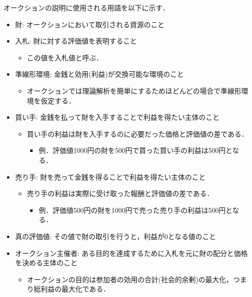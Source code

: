 オークションの説明に使用される用語を以下に示す\cite{market}．

\begin{itemize}
\tightlist
\item
  財: オークションにおいて取引される資源のこと
\item
  入札: 財に対する評価値を表明すること

  \begin{itemize}
  \tightlist
  \item
    この値を入札値と呼ぶ．
  \end{itemize}
\item
  準線形環境: 金銭と効用(利益)が交換可能な環境のこと

  \begin{itemize}
  \tightlist
  \item
    オークションでは理論解析を簡単にするためほどんどの場合で準線形環境を仮定する．
  \end{itemize}
\item
  買い手: 金銭を払って財を入手することで利益を得たい主体のこと

  \begin{itemize}
  \tightlist
  \item
    買い手の利益は財を入手するのに必要だった価格と評価値の差である．

    \begin{itemize}
    \tightlist
    \item
      例．評価値1000円の財を500円で買った買い手の利益は500円となる．
    \end{itemize}
  \end{itemize}
\item
  売り手: 財を売って金銭を得ることで利益を得たい主体のこと

  \begin{itemize}
  \tightlist
  \item
    売り手の利益は実際に受け取った報酬と評価値の差である．

    \begin{itemize}
    \tightlist
    \item
      例．評価値500円の財を1000円で売った売り手の利益は500円となる．
    \end{itemize}
  \end{itemize}
\item
  真の評価値: その値で財の取引を行うと，利益が0となる値のこと
\item
  オークション主催者:
  ある目的を達成するために入札を元に財の配分と価格を決める主体のこと

  \begin{itemize}
  \tightlist
  \item
    オークションの目的は参加者の効用の合計(社会的余剰)の最大化，つまり総利益の最大化である．
  \end{itemize}
\end{itemize}

